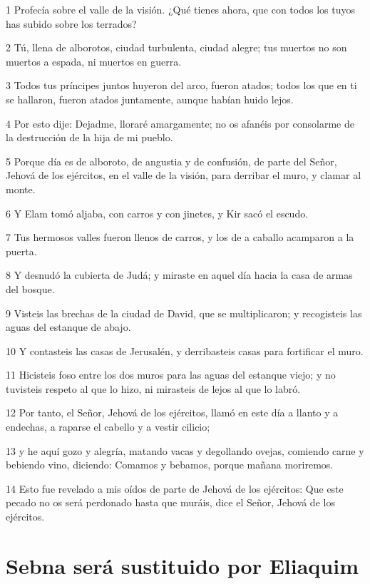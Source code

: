 \par 1 Profecía sobre el valle de la visión. ¿Qué tienes ahora, que con todos los tuyos has subido sobre los terrados?
\par 2 Tú, llena de alborotos, ciudad turbulenta, ciudad alegre; tus muertos no son muertos a espada, ni muertos en guerra.
\par 3 Todos tus príncipes juntos huyeron del arco, fueron atados; todos los que en ti se hallaron, fueron atados juntamente, aunque habían huido lejos.
\par 4 Por esto dije: Dejadme, lloraré amargamente; no os afanéis por consolarme de la destrucción de la hija de mi pueblo.
\par 5 Porque día es de alboroto, de angustia y de confusión, de parte del Señor, Jehová de los ejércitos, en el valle de la visión, para derribar el muro, y clamar al monte.
\par 6 Y Elam tomó aljaba, con carros y con jinetes, y Kir sacó el escudo.
\par 7 Tus hermosos valles fueron llenos de carros, y los de a caballo acamparon a la puerta.
\par 8 Y desnudó la cubierta de Judá; y miraste en aquel día hacia la casa de armas del bosque.
\par 9 Visteis las brechas de la ciudad de David, que se multiplicaron; y recogisteis las aguas del estanque de abajo. 
\par 10 Y contasteis las casas de Jerusalén, y derribasteis casas para fortificar el muro.
\par 11 Hicisteis foso entre los dos muros para las aguas del estanque viejo; y no tuvisteis respeto al que lo hizo, ni mirasteis de lejos al que lo labró.
\par 12 Por tanto, el Señor, Jehová de los ejércitos, llamó en este día a llanto y a endechas, a raparse el cabello y a vestir cilicio;
\par 13 y he aquí gozo y alegría, matando vacas y degollando ovejas, comiendo carne y bebiendo vino, diciendo: Comamos y bebamos, porque mañana moriremos. 
\par 14 Esto fue revelado a mis oídos de parte de Jehová de los ejércitos: Que este pecado no os será perdonado hasta que muráis, dice el Señor, Jehová de los ejércitos.

\section*{Sebna será sustituido por Eliaquim}

